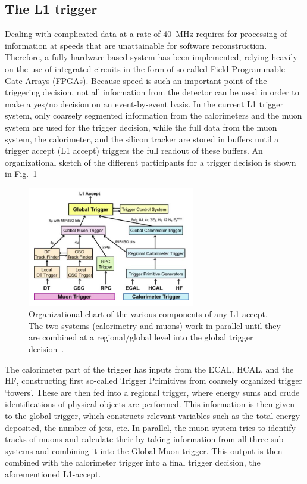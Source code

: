 \subsection{The L1 trigger}
\label{sub:l1}
Dealing with complicated data at a rate of \SI{40}{\mega\hertz} requires for processing of information at speeds that are unattainable for software reconstruction. 
Therefore, a fully hardware based system has been implemented, relying heavily on the use of integrated circuits in the form of so-called Field-Programmable-Gate-Arrays (FPGAs).
Because speed is such an important point of the triggering decision, not all information from the detector can be used in order to make a yes/no decision on an event-by-event
basis. In the current L1 trigger system, only coarsely segmented information from the calorimeters and the muon system are used for the trigger decision, 
while the full data from the muon system, the calorimeter, and the silicon tracker are stored in buffers until a trigger accept (L1 accept) triggers the full readout of these buffers.
An organizational sketch of the different participants for a trigger decision is shown in Fig.~\ref{fig:l1}
\begin{figure}[h!]
    \centering
    \includegraphics[width=0.65\textwidth]{../figs/l1_organi.png}
    \caption{Organizational chart of the various components of any L1-accept. The two systems (calorimetry and muons) work in parallel 
until they are combined at a regional/global level into the global trigger decision~\cite{cmsdetector}.}
    \label{fig:l1}
\end{figure}
The calorimeter part of the trigger has inputs from the ECAL, HCAL, and the HF, constructing first so-called Trigger Primitives from coarsely organized trigger `towers'. These are
then fed into a regional trigger, where energy sums and crude identifications of physical objects are performed. This information is then given to the global trigger, which constructs
relevant variables such as the total energy deposited, the number of jets, etc.
In parallel, the muon system tries to identify tracks of muons and calculate their \pt by taking information from all three sub-systems and combining it into the Global
Muon trigger. This output is then combined with the calorimeter trigger into a final trigger decision, the aforementioned L1-accept.


